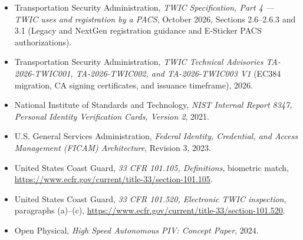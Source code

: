 \begin{itemize}
  \item Transportation Security Administration, \emph{TWIC Specification, Part 4 --- TWIC uses and registration by a PACS}, October 2026, Sections 2.6--2.6.3 and 3.1 (Legacy and NextGen registration guidance and E-Sticker PACS authorizations).
  \item Transportation Security Administration, \emph{TWIC Technical Advisories TA-2026-TWIC001, TA-2026-TWIC002, and TA-2026-TWIC003 V1} (EC384 migration, CA signing certificates, and issuance timeframe), 2026.
  \item National Institute of Standards and Technology, \emph{NIST Internal Report 8347, Personal Identity Verification Cards, Version 2}, 2021.
  \item U.S. General Services Administration, \emph{Federal Identity, Credential, and Access Management (FICAM) Architecture}, Revision 3, 2023.
  \item United States Coast Guard, \emph{33 CFR 101.105, Definitions}, biometric match, \url{https://www.ecfr.gov/current/title-33/section-101.105}.
  \item United States Coast Guard, \emph{33 CFR 101.520, Electronic TWIC inspection}, paragraphs (a)--(c), \url{https://www.ecfr.gov/current/title-33/section-101.520}.
  \item Open Physical, \emph{High Speed Autonomous PIV: Concept Paper}, 2024.
\end{itemize}

